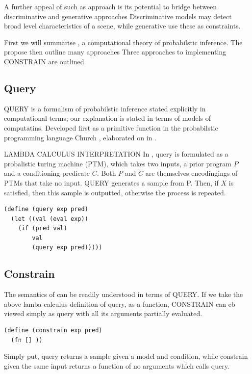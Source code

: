 A further appeal of such as approach is its potential to bridge between discriminative and generative approaches
Discriminative models may detect broad level characteristics of a scene, while generative use these as constraints.

First we will summarise , a computational theory of probabilstic inference.
The propose then outline many approaches
Three approaches to implementing CONSTRAIN are outlined


\subsection{Query}

QUERY is a formalism of probabilstic inference stated explicitly in computational terms; our explanation is stated in terms of models of computatins.
Developed first as a primitive function in the probabilstic programming language Church \citep{CHURCH}, elaborated on in \citep{VIKASH}.

LAMBDA CALCULUS INTERPRETATION
In \citep{FREER:2012}, query is formulated as a probalistic turing machine (PTM), which takes two inputs, a prior program $P$ and a conditioning predicate $C$.
Both $P$ and $C$ are themselves encodingings of PTMs that take no input.
QUERY generates a sample from P.
Then, if $X$ is satisfied, then this sample is outputted, otherwise the process is repeated.

\begin{verbatim}
(define (query exp pred)
  (let ((val (eval exp))
    (if (pred val)
        val
        (query exp pred)))))
\end{verbatim}

\subsection{Constrain}
The semantics of  can be readily understood in terms of QUERY.
If we take the above lamba-calculus definition of query, as a function, CONSTRAIN can eb viewed simply as query with all its arguments partially evaluated.

\begin{verbatim}
(define (constrain exp pred)
  (fn [] ))
\end{verbatim}

Simply put, query returns a sample given a model and condition, while constrain given the same input returns a function of no arguments which calls query.

